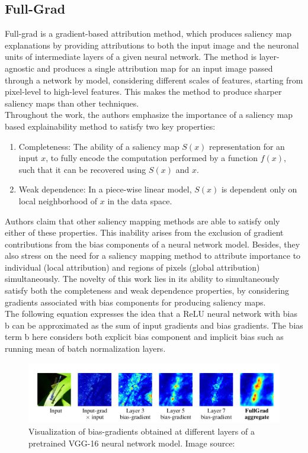 \documentclass[../report.tex]{subfiles}
\begin{document}
\subsection{Full-Grad}
Full-grad \cite{srinivas2019full} is a gradient-based attribution method, which produces saliency map explanations by providing attributions to both the input image and the neuronal units of intermediate layers of a given neural network. The method is layer-agnostic and produces a single attribution map for an input image passed through a network by model, considering different scales of features, starting from pixel-level to high-level features. This makes the method to produce sharper saliency maps than other techniques.\\
Throughout the work, the authors emphasize the importance of a saliency map based explainability method to satisfy two key properties: 
\begin{enumerate}
	\item Completeness: The ability of a saliency map $S(x)$ representation for an input $x$, to fully encode the computation performed by a function $f(x)$, such that it can be recovered using $S(x)$ and $x$.
	\item Weak dependence: In a piece-wise linear model, $S(x)$ is dependent only on local neighborhood of $x$ in the data space. 
\end{enumerate}
Authors claim that other saliency mapping methods are able to satisfy only either of these properties. This inability arises from  the exclusion of gradient contributions from the bias components of a neural network model. Besides, they also stress on the need for a saliency mapping method to attribute importance to individual (local attribution) and regions of pixels (global attribution) simultaneously. The novelty of this work lies in its ability to simultaneously satisfy both the completeness and weak dependence properties, by considering gradients associated with bias components for producing saliency maps.\\
The following equation expresses the idea that a ReLU neural network with bias b can be approximated as the sum of  input gradients and bias gradients. The bias term b here considers both explicit bias component and implicit bias such as running mean of batch normalization layers. 
\begin{figure}[H]
	\centering
	\includegraphics[width=\textwidth]{images/chapter3/full_grad.png}
	\caption{Visualization of bias-gradients obtained at different layers of a pretrained VGG-16 neural network model. Image source: \cite{srinivas2019full}}
	\label{fig_fullgrad_op}
\end{figure}
	
\end{document}
